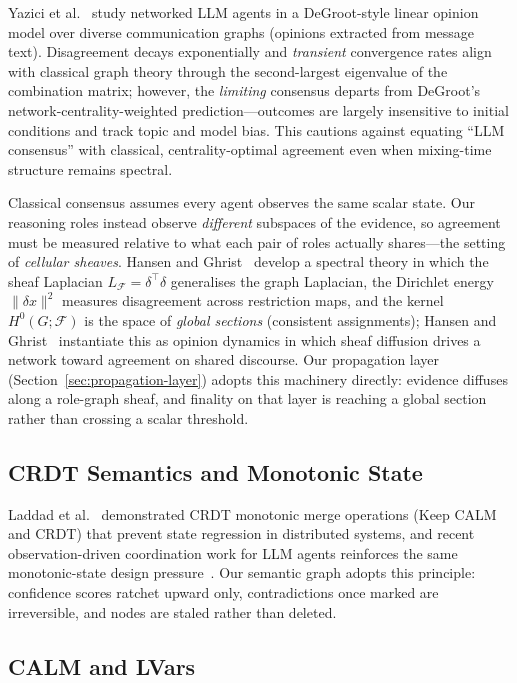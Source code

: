 \documentclass[11pt]{article}
\begin{document}
Yazici et al.\ \cite{yazici2026opinion} study networked LLM agents in a DeGroot-style linear opinion model over diverse communication graphs (opinions extracted from message text). Disagreement decays exponentially and \emph{transient} convergence rates align with classical graph theory through the second-largest eigenvalue of the combination matrix; however, the \emph{limiting} consensus departs from DeGroot's network-centrality-weighted prediction---outcomes are largely insensitive to initial conditions and track topic and model bias. This cautions against equating ``LLM consensus'' with classical, centrality-optimal agreement even when mixing-time structure remains spectral.

Classical consensus assumes every agent observes the same scalar state. Our reasoning roles instead observe \emph{different} subspaces of the evidence, so agreement must be measured relative to what each pair of roles actually shares---the setting of \emph{cellular sheaves}. Hansen and Ghrist~\cite{ghrist2022} develop a spectral theory in which the sheaf Laplacian $L_{\mathcal{F}} = \delta^\top\delta$ generalises the graph Laplacian, the Dirichlet energy $\|\delta x\|^2$ measures disagreement across restriction maps, and the kernel $H^0(G;\mathcal{F})$ is the space of \emph{global sections} (consistent assignments); Hansen and Ghrist~\cite{hansen2021opinion} instantiate this as opinion dynamics in which sheaf diffusion drives a network toward agreement on shared discourse. Our propagation layer (Section~\ref{sec:propagation-layer}) adopts this machinery directly: evidence diffuses along a role-graph sheaf, and finality on that layer is reaching a global section rather than crossing a scalar threshold.


\subsection{CRDT Semantics and Monotonic State}

Laddad et al.\ \cite{laddad2024} demonstrated CRDT monotonic merge operations (Keep CALM and CRDT) that prevent state regression in distributed systems, and recent observation-driven coordination work for LLM agents reinforces the same monotonic-state design pressure~\cite{codecrdt2025}. Our semantic graph adopts this principle: confidence scores ratchet upward only, contradictions once marked are irreversible, and nodes are staled rather than deleted.

\subsection{CALM and LVars}
\end{document}
